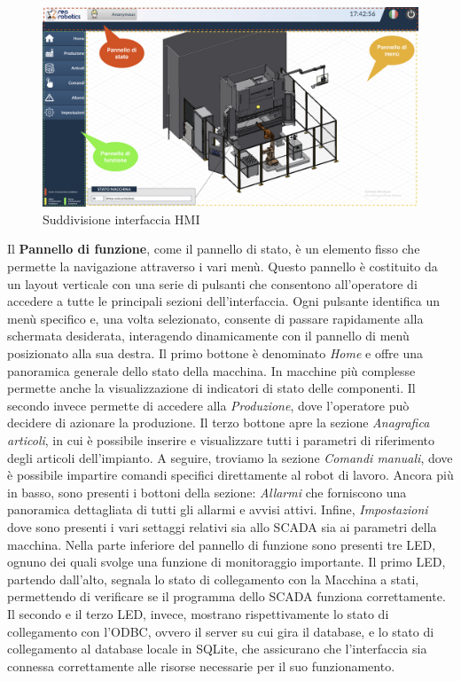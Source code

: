 \begin{figure} 
    \centering
    \includegraphics[width=1\linewidth]{Immagini/HMI00.png}
    \caption{Suddivisione interfaccia HMI}
    \label{fig:HMI00.png}
\end{figure}

Il \textbf{Pannello di funzione}, come il pannello di stato, è un elemento fisso che permette la navigazione attraverso i vari menù. Questo pannello è costituito da un layout verticale con una serie di pulsanti che consentono all'operatore di accedere a tutte le principali sezioni dell'interfaccia. Ogni pulsante identifica un menù specifico e, una volta selezionato, consente di passare rapidamente alla schermata desiderata, interagendo dinamicamente con il pannello di menù posizionato alla sua destra.
Il primo bottone è denominato \textit{Home} e offre una panoramica generale dello stato della macchina. In macchine più complesse permette anche la visualizzazione di indicatori di stato delle componenti. Il secondo invece permette di accedere alla \textit{Produzione}, dove l'operatore può decidere di azionare la produzione. Il terzo bottone apre la sezione \textit{Anagrafica articoli}, in cui è possibile inserire e visualizzare tutti i parametri di riferimento degli articoli dell'impianto. A seguire, troviamo la sezione \textit{Comandi manuali}, dove è possibile impartire comandi specifici direttamente al robot di lavoro. Ancora più in basso, sono presenti i bottoni della sezione: \textit{Allarmi} che forniscono una panoramica dettagliata di tutti gli allarmi e avvisi attivi. Infine, \textit{Impostazioni} dove sono presenti i vari settaggi relativi sia allo SCADA sia ai parametri della macchina. 
Nella parte inferiore del pannello di funzione sono presenti tre LED, ognuno dei quali svolge una funzione di monitoraggio importante. Il primo LED, partendo dall'alto, segnala lo stato di collegamento con la Macchina a stati, permettendo di verificare se il programma dello SCADA funziona correttamente. Il secondo e il terzo LED, invece, mostrano rispettivamente lo stato di collegamento con l'ODBC, ovvero il server su cui gira il database, e lo stato di collegamento al database locale in SQLite, che assicurano che l'interfaccia sia connessa correttamente alle risorse necessarie per il suo funzionamento.


